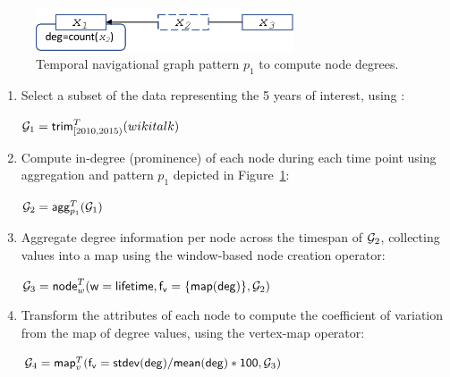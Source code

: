 %

\begin{figure}
\centering
\includegraphics[width=3in]{figs/degrees.pdf}
\caption{Temporal navigational graph pattern $p_1$ to compute node degrees.}
\vspace{-0.2cm}
\label{fig:degrees}
\vspace{-0.2cm}
\end{figure}

\begin{enumerate}[itemindent=\dimexpr\labelwidth+\labelsep\relax,leftmargin=0pt]
\item Select a subset of the data representing the 5 years of
  interest, using :

$\mathcal{G}_1 = \textsf{trim}^T_{[2010,2015)}(wikitalk)$

\item Compute in-degree (prominence) of each node during each time
  point using aggregation and pattern $p_1$ depicted in Figure~\ref{fig:degrees}:

$\mathcal{G}_2 = \textsf{agg}^T_{p_1}(\mathcal{G}_1)$

\item Aggregate degree information per node across the timespan of
  $\mathcal{G}_2$, collecting values into a map using the window-based node
  creation operator:

$\mathcal{G}_3 =\textsf{node}^T_w(\mathsf{w=lifetime},\mathsf{f_v=\{map(deg)\}},\mathcal{G}_2)$

\item Transform the attributes of each node to compute the
  coefficient of variation from the map of degree values, using the
  vertex-map operator:

$\mathcal{G}_4 = \textsf{map}^T_v(\mathsf{f_v=stdev(deg)/mean(deg)*100}, \mathcal{G}_3)$
\end{enumerate}

